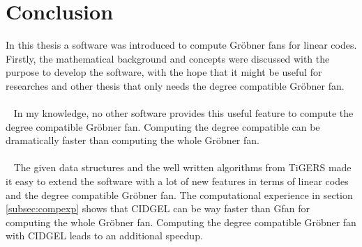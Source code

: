 \section{Conclusion}
\label{sec:concl}

In this thesis a software was introduced to compute Gröbner fans for linear codes. Firstly, the mathematical background and concepts were discussed with the purpose to develop the software, with the hope that it might be useful for researches and other thesis that only needs the degree compatible Gröbner fan.\\
\\~
In my knowledge, no other software provides this useful feature to compute the degree compatible Gröbner fan. Computing the degree compatible can be dramatically faster than computing the whole Gröbner fan.\\
\\~
The given data structures and the well written algorithms from TiGERS \cite{tigers} made it easy to extend the software with a lot of new features in terms of linear codes and the degree compatible Gröbner fan. The computational experience in section \ref{subsec:compexp} shows that CIDGEL can be way faster than Gfan for computing the whole Gröbner fan. Computing the degree compatible Gröbner fan with CIDGEL leads to an additional speedup.